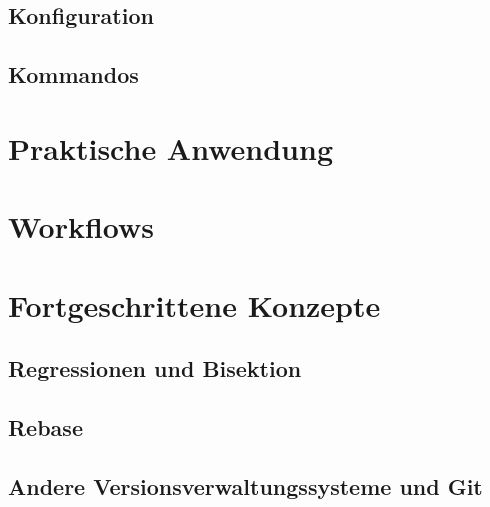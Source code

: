 \subsection{Konfiguration}
\label{sec:Konfiguration}
\subsection{Kommandos}
\label{sec:Kommandos}
\section{Praktische Anwendung}
\label{sec:Praxis}
\section{Workflows}
\label{sec:Workflows}
\section{Fortgeschrittene Konzepte}
\label{sec:FortgeschritteneKonzepte}
\subsection{Regressionen und Bisektion}
\label{sec:Regressionen}
\subsection{Rebase}
\label{sec:Rebase}
\subsection{Andere Versionsverwaltungssysteme und Git}
\label{sec:AndereVersionsverwaltungssystemeundGit}
